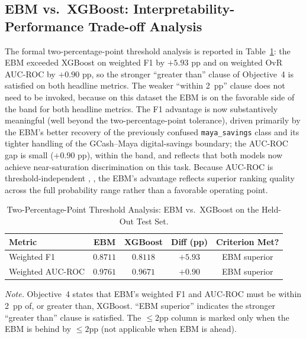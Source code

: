 \documentclass[journal]{./IEEE/IEEEtran}
\begin{document}
\subsection{EBM vs.\ XGBoost: Interpretability-Performance Trade-off Analysis}

The formal two-percentage-point threshold analysis is reported in Table~\ref{tab:threshold}: the EBM exceeded XGBoost on weighted F1 by $+5.93$ pp and on weighted OvR AUC-ROC by $+0.90$ pp, so the stronger ``greater than'' clause of Objective~4 is satisfied on both headline metrics. The weaker ``within 2~pp'' clause does not need to be invoked, because on this dataset the EBM is on the favorable side of the band for both headline metrics. The F1 advantage is now substantively meaningful (well beyond the two-percentage-point tolerance), driven primarily by the EBM's better recovery of the previously confused \texttt{maya\_savings} class and its tighter handling of the GCash--Maya digital-savings boundary; the AUC-ROC gap is small ($+0.90$ pp), within the band, and reflects that both models now achieve near-saturation discrimination on this task. Because AUC-ROC is threshold-independent \cite{ref81}, \cite{ref82}, the EBM's advantage reflects superior ranking quality across the full probability range rather than a favorable operating point.

\begin{table}[h]
    \centering
    \caption{Two-Percentage-Point Threshold Analysis: EBM vs.\ XGBoost on the Held-Out Test Set.}
    \label{tab:threshold}
    \footnotesize
    \begin{tabular}{|p{1.7cm}|c|c|c|c|}
        \hline
        \textbf{Metric} & \textbf{EBM} & \textbf{XGBoost} & \textbf{Diff (pp)} & \textbf{Criterion Met?} \\
        \hline
        Weighted F1 & $0.8711$ & $0.8118$ & $+5.93$ & EBM superior \\
        Weighted AUC-ROC & $0.9761$ & $0.9671$ & $+0.90$ & EBM superior \\
        \hline
    \end{tabular}

    \vspace{0.5em}
    \raggedright\scriptsize \emph{Note.} Objective~4 states that EBM's weighted F1 and AUC-ROC must be within 2~pp of, or greater than, XGBoost. ``EBM superior'' indicates the stronger ``greater than'' clause is satisfied. The $\leq 2$pp column is marked only when the EBM is behind by $\leq 2$pp (not applicable when EBM is ahead).
\end{table}
\end{document}
